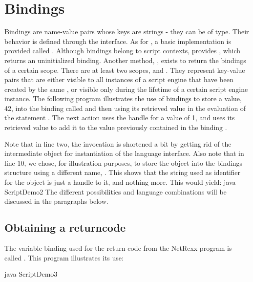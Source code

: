 \section{Bindings}
Bindings are name-value pairs whose keys are strings - they can be of
\Rexx{} type. Their behavior is defined through the
 interface. As for
, a basic implementation is provided called
. Although bindings belong to script contexts,
 provides , which
returns an uninitialized binding. Another method,
, exists to return the bindings of a certain
scope. There are at least two scopes,
 and
. They represent key-value pairs
that are either visible to all instances of a script engine that have
been created by the same , or visible
only during the lifetime of a certain script engine instance. The
following program illustrates the use of bindings to store a value,
42, into the binding called  and then using its
retrieved value in the evaluation of the statement . The next action uses the handle 
for a value of 1, and uses its retrieved value to add it to the value
previously contained in the binding .
 
Note that in line two, the invocation is shortened a bit by getting rid of the intermediate  object for instantiation of the language interface. Also note that in line 10, we chose, for illustration purposes, to store the  object into the bindings structure using a different name, . This shows that the string used as identifier for the object is just a handle to it, and nothing more.
This would yield:
\bash[stdout]
java ScriptDemo2
\END
The different possibilities and language combinations will be
discussed in the paragraphs below.

\subsection{Obtaining a returncode}
The variable binding used for the return code from the NetRexx program
is called . This program illustrates its use: 
 
\bash[stdout]
java ScriptDemo3
\END

